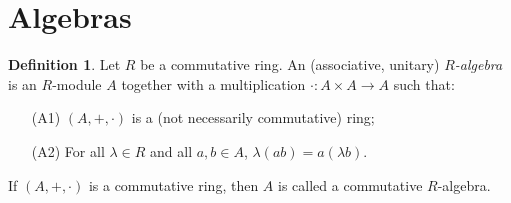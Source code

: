 \documentclass[12pt,a4paper]{report}
\theoremstyle{definition}
\newtheorem{defn}[theorem]{Definition}
\theoremstyle{num.custom-title}
\begin{document}
\section{Algebras}

\begin{defn}
Let $R$ be a commutative ring. An (associative, unitary) $R$\emph{-algebra} is an $R$-module $A$ together with a multiplication $\cdot : A \times A \to A$ such that:
\begin{itemize}
\item[(A1)] $(A,+,\cdot)$ is a (not necessarily commutative) ring;
\item[(A2)] For all $\lambda \in R$ and all $a,b \in A$, $\lambda (ab) = a (\lambda b)$.
\end{itemize}
If $(A,+,\cdot)$ is a commutative ring, then $A$ is called a commutative $R$-algebra.
\end{defn}
\end{document}
